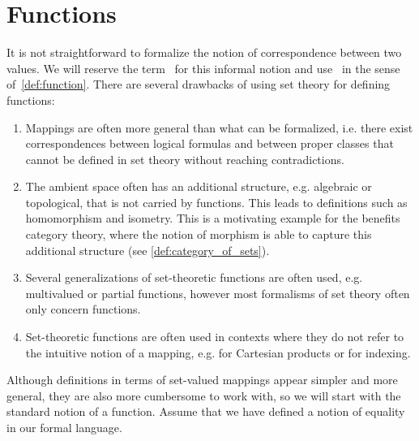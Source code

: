 \section{Functions}\label{sec:functions}

It is not straightforward to formalize the notion of correspondence between two values. We will reserve the term~ for this informal notion and use~ in the sense of~\cref{def:function}. There are several drawbacks of using set theory for defining functions:
\begin{enumerate}
  \item Mappings are often more general than what can be formalized, i.e. there exist correspondences between logical formulas and between proper classes that cannot be defined in set theory without reaching contradictions.
  \item The ambient space often has an additional structure, e.g. algebraic or topological, that is not carried by functions. This leads to definitions such as homomorphism and isometry. This is a motivating example for the benefits category theory, where the notion of morphism is able to capture this additional structure (see \cref{def:category_of_sets}).
  \item Several generalizations of set-theoretic functions are often used, e.g. multivalued or partial functions, however most formalisms of set theory often only concern functions.
  \item Set-theoretic functions are often used in contexts where they do not refer to the intuitive notion of a mapping, e.g. for Cartesian products or for indexing.
\end{enumerate}

Although definitions in terms of set-valued mappings appear simpler and more general, they are also more cumbersome to work with, so we will start with the standard notion of a function. Assume that we have defined a notion of equality in our formal language.


